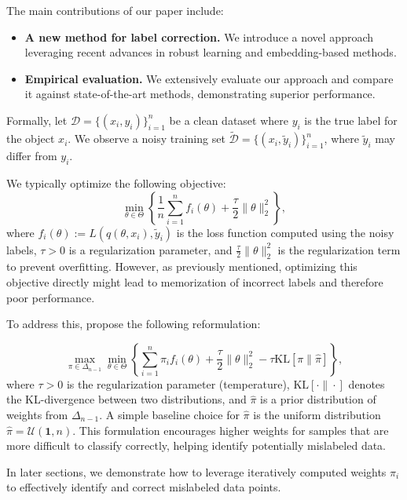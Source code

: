 \documentclass[12pt]{article}
\begin{document}
The main contributions of our paper include:
\begin{itemize}
    \item \textbf{A new method for label correction.} We introduce a novel approach leveraging recent advances in robust learning and embedding-based methods.
    \item \textbf{Empirical evaluation.} We extensively evaluate our approach and compare it against state-of-the-art methods, demonstrating superior performance.
\end{itemize}

Formally, let \(\mathcal{D} = \{(x_i, y_i)\}_{i=1}^{n}\) be a clean dataset where \(y_i\) is the true label for the object \(x_i\). We observe a noisy training set \(\tilde{\mathcal{D}} = \{(x_i, \tilde{y}_i)\}_{i=1}^{n}\), where \(\tilde{y}_i\) may differ from \(y_i\).

We typically optimize the following objective:
\begin{equation}
    \min_{\theta \in \Theta} \left\{
        \frac{1}{n}\sum_{i=1}^{n} f_i(\theta) + \frac{\tau}{2}\|\theta\|_2^2
    \right\},
\end{equation}
where \(f_i(\theta) := L(q(\theta, x_i), \tilde{y}_i)\) is the loss function computed using the noisy labels, \(\tau > 0\) is a regularization parameter, and \(\frac{\tau}{2}\|\theta\|_2^2\) is the regularization term to prevent overfitting. However, as previously mentioned, optimizing this objective directly might lead to memorization of incorrect labels and therefore poor performance.

To address this, \citet{also} propose the following reformulation:

\begin{equation}
    \max_{\pi \in \Delta_{n-1}} \min_{\theta \in \Theta}
    \left\{
        \sum_{i=1}^{n}\pi_i f_i(\theta)
        + \frac{\tau}{2}\|\theta\|_2^2
        - \tau\text{KL}[\pi\|\hat{\pi}]
    \right\},
\end{equation}
where \(\tau > 0\) is the regularization parameter (temperature), \(\text{KL}[\cdot\|\cdot]\) denotes the KL-divergence between two distributions, and \(\hat{\pi}\) is a prior distribution of weights from \(\Delta_{n-1}\). A simple baseline choice for \(\hat{\pi}\) is the uniform distribution \(\hat{\pi} = \mathcal{U}(\mathbf{1}, n)\). This formulation encourages higher weights for samples that are more difficult to classify correctly, helping identify potentially mislabeled data.

In later sections, we demonstrate how to leverage iteratively computed weights \(\pi_i\) to effectively identify and correct mislabeled data points.
\end{document}
